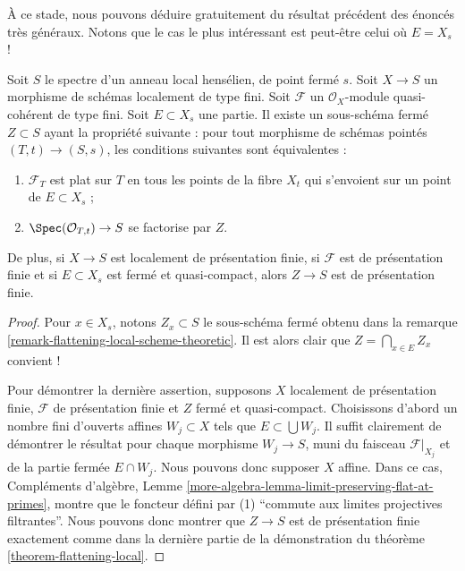 \noindent
À ce stade, nous pouvons déduire gratuitement du résultat précédent des énoncés
très généraux. Notons que le cas le plus intéressant est peut-être
celui où $E = X_s$ !

\begin{lemma}
\label{lemma-freebie}
Soit $S$ le spectre d'un anneau local hensélien, de point fermé $s$.
Soit $X \to S$ un morphisme de schémas localement de type fini.
Soit $\mathcal{F}$ un $\mathcal{O}_X$-module quasi-cohérent de type fini.
Soit $E \subset X_s$ une partie. Il existe un sous-schéma fermé
$Z \subset S$ ayant la propriété suivante : pour tout morphisme de schémas pointés
$(T, t) \to (S, s)$, les conditions suivantes sont équivalentes :
\begin{enumerate}
\item $\mathcal{F}_T$ est plat sur $T$ en tous les points de la fibre
$X_t$ qui s'envoient sur un point de $E \subset X_s$ ;
\item $\Spec(\mathcal{O}_{T, t}) \to S$ se factorise par $Z$.
\end{enumerate}
De plus, si $X \to S$ est localement de présentation finie,
si $\mathcal{F}$ est de présentation finie et si $E \subset X_s$ est
fermé et quasi-compact, alors $Z \to S$ est de présentation finie.
\end{lemma}

\begin{proof}
Pour $x \in X_s$, notons $Z_x \subset S$ le sous-schéma fermé obtenu dans la
remarque \ref{remark-flattening-local-scheme-theoretic}.
Il est alors clair que $Z = \bigcap_{x \in E} Z_x$ convient !

\medskip\noindent
Pour démontrer la dernière assertion, supposons $X$ localement de présentation finie,
$\mathcal{F}$ de présentation finie et $Z$ fermé et quasi-compact.
Choisissons d'abord un nombre fini d'ouverts affines $W_j \subset X$ tels que
$E \subset \bigcup W_j$. Il suffit clairement de démontrer le
résultat pour chaque morphisme $W_j \to S$, muni du faisceau $\mathcal{F}|_{X_j}$
et de la partie fermée $E \cap W_j$. Nous pouvons donc supposer $X$ affine.
Dans ce cas,
Compléments d'algèbre, Lemme \ref{more-algebra-lemma-limit-preserving-flat-at-primes},
montre que le foncteur défini par (1) ``commute aux limites projectives filtrantes''.
Nous pouvons donc montrer que $Z \to S$ est de présentation finie exactement
comme dans la dernière partie de la démonstration du
théorème \ref{theorem-flattening-local}.
\end{proof}

